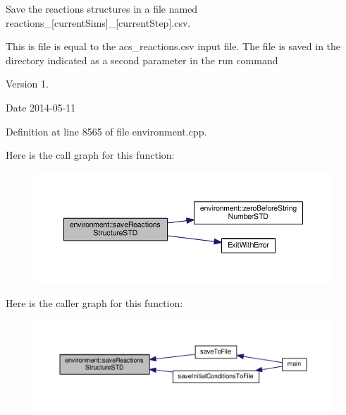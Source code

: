 Save the reactions structures in a file named reactions\-\_\-\mbox{[}current\-Sims\mbox{]}\-\_\-\mbox{[}current\-Step\mbox{]}.csv. 

This is file is equal to the acs\-\_\-reactions.\-csv input file. The file is saved in the directory indicated as a second parameter in the run command \begin{DoxyVersion}{Version}
1. 
\end{DoxyVersion}
\begin{DoxyDate}{Date}
2014-\/05-\/11 
\end{DoxyDate}


Definition at line 8565 of file environment.\-cpp.



Here is the call graph for this function\-:\nopagebreak
\begin{figure}[H]
\begin{center}
\leavevmode
\includegraphics[width=350pt]{a00011_ad381c4ce24045d504539bb7c74800739_cgraph}
\end{center}
\end{figure}




Here is the caller graph for this function\-:\nopagebreak
\begin{figure}[H]
\begin{center}
\leavevmode
\includegraphics[width=350pt]{a00011_ad381c4ce24045d504539bb7c74800739_icgraph}
\end{center}
\end{figure}


